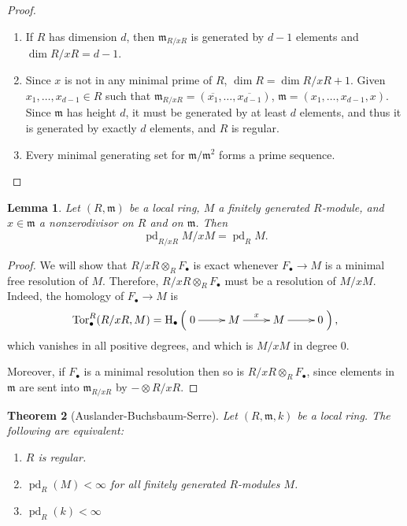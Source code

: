 \documentclass[11pt]{book}
\newtheorem{theorem}{Theorem}[chapter]
\newtheorem{lemma}[theorem]{Lemma}
\numberwithin{equation}{section}
\numberwithin{theorem}{chapter}
\theoremstyle{definition}
\newtheorem*{basic properties}{Basic Properties}
\newtheorem*{Important Remark}{Important Remark}
\theoremstyle{remark}
\newcommand{\m}{\mathfrak{m}}
\newcommand{\Tor}{\operatorname{Tor}}
\renewcommand{\dim}{\operatorname{dim}}
\newcommand{\pd}{\operatorname{pd}}
\renewcommand{\H}{\operatorname{H}}
\begin{document}
\begin{proof}$\,$
	\begin{enumerate}[1)]
		\item If $R$ has dimension $d$, then $\m_{R/xR}$ is generated by $d-1$ elements and $\dim R/xR = d-1$.
		\item Since $x$ is not in any minimal prime of $R$, $\dim R = \dim R/xR + 1$. Given $x_1, \ldots, x_{d-1} \in R$ such that $\m_{R/xR} = \left( \overline{x_1}, \ldots, \overline{x_{d-1}} \right)$, $\m = \left(  x_1, \ldots, x_{d-1}, x \right)$. Since $\m$ has height $d$, it must be generated by at least $d$ elements, and thus it is generated by exactly $d$ elements, and $R$ is regular.
		\item Every minimal generating set for $\m / \m^2$ forms a prime sequence.
	\end{enumerate}
\end{proof}




\begin{lemma}\label{pd mod nzd}
	Let $(R, \m)$ be a local ring, $M$ a finitely generated $R$-module, and $x \in \m$ a nonzerodivisor on $R$ and on $\m$. Then
	$$\pd_{R/xR} M/xM = \pd_R M.$$
\end{lemma}

\begin{proof}
	We will show that $R/xR \otimes_R F_\bullet$ is exact whenever $F_\bullet \longrightarrow M$ is a minimal free resolution of $M$. Therefore, $R/xR \otimes_R F_\bullet$ must be a resolution of $M/xM$. Indeed, the homology of $F_\bullet \longrightarrow M$ is
	$$\Tor_\bullet^R(R/xR, M) = \H_\bullet \left( \xymatrix{0 \ar[r] & M \ar[r]^-x & M \ar[r] & 0} \right),$$
	which vanishes in all positive degrees, and which is $M/xM$ in degree $0$.
	
	Moreover, if $F_\bullet$ is a minimal resolution then so is $R/xR \otimes_R F_\bullet$, since elements in $\m$ are sent into $\m_{R/xR}$ by $-\otimes R/xR$.
\end{proof}

\begin{theorem}[Auslander-Buchsbaum-Serre]\label{Auslander-Buchsbaum-Serre}
Let $(R,\m,k)$ be a local ring. The following are equivalent:
	\begin{enumerate}[1)]
		\item $R$ is regular.
		\item $\pd_R(M) < \infty$ for all finitely generated $R$-modules $M$.
		\item $\pd_R(k) < \infty$
	\end{enumerate}
\end{theorem}
\end{document}
